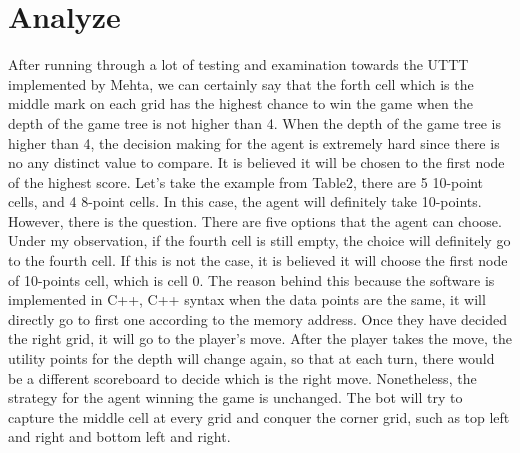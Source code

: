\documentclass[12pt]{article}
\begin{document}
\section{Analyze}
After running through a lot of testing and examination towards the UTTT implemented by Mehta, we can certainly say that the forth cell which is the middle mark on each grid has the highest chance to win the game when the depth of the game tree is not higher than 4. When the depth of the game tree is higher than 4, the decision making for the agent is extremely hard since there is no any distinct value to compare. It is believed it will be chosen to the first node of the highest score. Let's take the example from Table2, there are 5 10-point cells, and 4 8-point cells. In this case, the agent will definitely take 10-points. However, there is the question. There are five options that the agent can choose. Under my observation, if the fourth cell is still empty, the choice will definitely go to the fourth cell. If this is not the case, it is believed it will choose the first node of 10-points cell, which is cell 0. The reason behind this because the software is implemented in C++, C++ syntax when the data points are the same, it will directly go to first one according to the memory address. Once they have decided the right grid, it will go to the player's move. After the player takes the move, the utility points for the depth will change again, so that at each turn, there would be a different scoreboard to decide which is the right move. Nonetheless, the strategy for the agent winning the game is unchanged. The bot will try to capture the middle cell at every grid and conquer the corner grid, such as top left and right and bottom left and right. 
\newline
\end{document}
